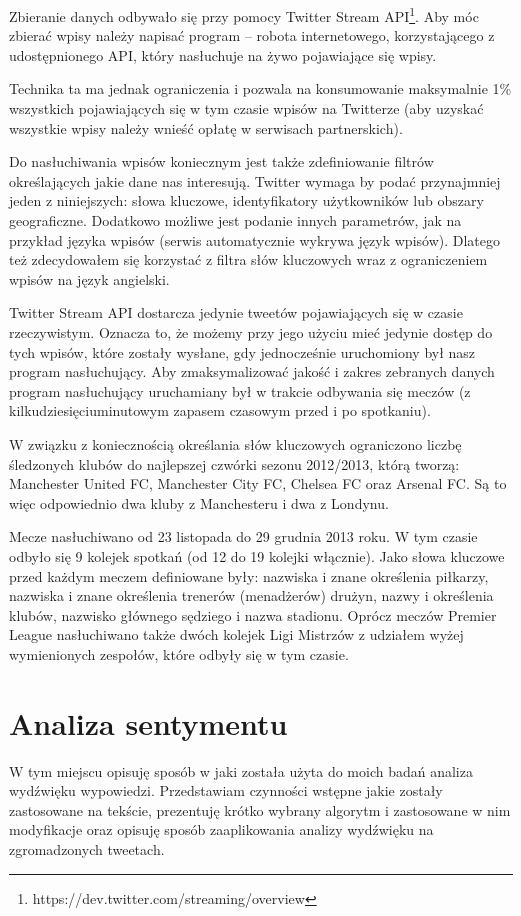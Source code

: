 Zbieranie danych odbywało się przy pomocy Twitter Stream 
API\footnote{https://dev.twitter.com/streaming/overview}.
Aby móc zbierać wpisy należy napisać program -- robota internetowego,
korzystającego z udostępnionego API, który nasłuchuje na żywo pojawiające się wpisy.

Technika ta ma jednak ograniczenia i pozwala na konsumowanie maksymalnie 1\%
wszystkich pojawiających się w tym czasie wpisów na Twitterze (aby uzyskać
wszystkie wpisy należy wnieść opłatę w serwisach partnerskich).

Do nasłuchiwania wpisów koniecznym jest także zdefiniowanie filtrów
określających jakie dane nas interesują. Twitter wymaga by podać przynajmniej
jeden z niniejszych: słowa kluczowe, identyfikatory użytkowników lub obszary
geograficzne. Dodatkowo możliwe jest podanie innych parametrów, jak na przykład
języka wpisów (serwis automatycznie wykrywa język wpisów). 
Dlatego też zdecydowałem się korzystać z filtra słów kluczowych
wraz z ograniczeniem wpisów na język angielski.

Twitter Stream API dostarcza jedynie tweetów pojawiających się w czasie
rzeczywistym. Oznacza to, że możemy przy jego użyciu mieć jedynie dostęp do tych
wpisów, które zostały wysłane, gdy jednocześnie uruchomiony był nasz program
nasłuchujący. Aby zmaksymalizować jakość i zakres zebranych danych program
nasłuchujący uruchamiany był w trakcie odbywania się meczów 
(z kilkudziesięciuminutowym zapasem czasowym przed i po spotkaniu).

W związku z koniecznością określania słów kluczowych ograniczono liczbę
śledzonych klubów do najlepszej czwórki sezonu 2012/2013, którą tworzą:
Manchester United FC, Manchester City FC, Chelsea FC oraz Arsenal FC.
Są to więc odpowiednio dwa kluby z Manchesteru i dwa z Londynu.

Mecze nasłuchiwano od 23 listopada do 29 grudnia 2013 roku. W tym czasie odbyło
się 9 kolejek spotkań (od 12 do 19 kolejki włącznie). Jako słowa kluczowe przed
każdym meczem definiowane były: nazwiska i znane określenia
piłkarzy, nazwiska i znane określenia trenerów (menadżerów) drużyn, nazwy i
określenia klubów, nazwisko głównego sędziego i nazwa stadionu. 
Oprócz meczów Premier League nasłuchiwano także dwóch kolejek Ligi Mistrzów
z udziałem wyżej wymienionych zespołów, które odbyły się w tym czasie.


\section{Analiza sentymentu}
\label{section:analizasentymentu}
W tym miejscu opisuję sposób w jaki została użyta do moich badań analiza
wydźwięku wypowiedzi. Przedstawiam czynności wstępne jakie zostały zastosowane
na tekście, prezentuję krótko wybrany algorytm i zastosowane w nim modyfikacje
oraz opisuję sposób zaaplikowania analizy wydźwięku na zgromadzonych tweetach.

